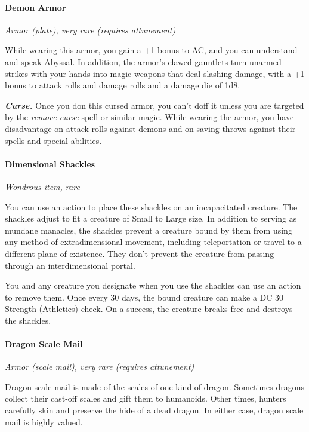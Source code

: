 \documentclass[
]{article}
\begin{document}
\hypertarget{demon-armor}{%
\paragraph{Demon Armor}\label{demon-armor}}

\emph{Armor (plate), very rare (requires attunement)}

While wearing this armor, you gain a +1 bonus to AC, and you can
understand and speak Abyssal. In addition, the armor's clawed gauntlets
turn unarmed strikes with your hands into magic weapons that deal
slashing damage, with a +1 bonus to attack rolls and damage rolls and a
damage die of 1d8.

\emph{\textbf{Curse.}} Once you don this cursed armor, you can't doff it
unless you are targeted by the \emph{remove curse} spell or similar
magic. While wearing the armor, you have disadvantage on attack rolls
against demons and on saving throws against their spells and special
abilities.

\hypertarget{dimensional-shackles}{%
\paragraph{Dimensional Shackles}\label{dimensional-shackles}}

\emph{Wondrous item, rare}

You can use an action to place these shackles on an incapacitated
creature. The shackles adjust to fit a creature of Small to Large size.
In addition to serving as mundane manacles, the shackles prevent a
creature bound by them from using any method of extradimensional
movement, including teleportation or travel to a different plane of
existence. They don't prevent the creature from passing through an
interdimensional portal.

You and any creature you designate when you use the shackles can use an
action to remove them. Once every 30 days, the bound creature can make a
DC 30 Strength (Athletics) check. On a success, the creature breaks free
and destroys the shackles.

\hypertarget{dragon-scale-mail}{%
\paragraph{Dragon Scale Mail}\label{dragon-scale-mail}}

\emph{Armor (scale mail), very rare (requires attunement)}

Dragon scale mail is made of the scales of one kind of dragon. Sometimes
dragons collect their cast-off scales and gift them to humanoids. Other
times, hunters carefully skin and preserve the hide of a dead dragon. In
either case, dragon scale mail is highly valued.
\end{document}

